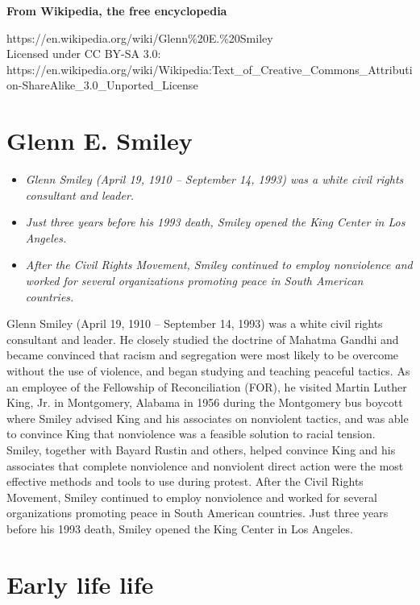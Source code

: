 \textbf{From Wikipedia, the free encyclopedia}

https://en.wikipedia.org/wiki/Glenn\%20E.\%20Smiley\\
Licensed under CC BY-SA 3.0:\\
https://en.wikipedia.org/wiki/Wikipedia:Text\_of\_Creative\_Commons\_Attribution-ShareAlike\_3.0\_Unported\_License

\section{Glenn E. Smiley}\label{glenn-e.-smiley}

\begin{itemize}
\item
  \emph{Glenn Smiley (April 19, 1910 -- September 14, 1993) was a white
  civil rights consultant and leader.}
\item
  \emph{Just three years before his 1993 death, Smiley opened the King
  Center in Los Angeles.}
\item
  \emph{After the Civil Rights Movement, Smiley continued to employ
  nonviolence and worked for several organizations promoting peace in
  South American countries.}
\end{itemize}

Glenn Smiley (April 19, 1910 -- September 14, 1993) was a white civil
rights consultant and leader. He closely studied the doctrine of Mahatma
Gandhi and became convinced that racism and segregation were most likely
to be overcome without the use of violence, and began studying and
teaching peaceful tactics. As an employee of the Fellowship of
Reconciliation (FOR), he visited Martin Luther King, Jr. in Montgomery,
Alabama in 1956 during the Montgomery bus boycott where Smiley advised
King and his associates on nonviolent tactics, and was able to convince
King that nonviolence was a feasible solution to racial tension. Smiley,
together with Bayard Rustin and others, helped convince King and his
associates that complete nonviolence and nonviolent direct action were
the most effective methods and tools to use during protest. After the
Civil Rights Movement, Smiley continued to employ nonviolence and worked
for several organizations promoting peace in South American countries.
Just three years before his 1993 death, Smiley opened the King Center in
Los Angeles.

\section{Early life life}\label{early-life-life}

